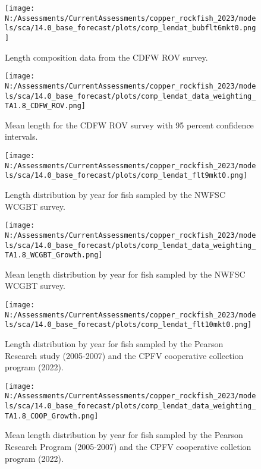 \documentclass[11pt,
  english,
  letterpaper,
]{article}
\begin{document}
\begin{figure}
\centering
\texttt{[image: N:/Assessments/CurrentAssessments/copper\_rockfish\_2023/models/sca/14.0\_base\_forecast/plots/comp\_lendat\_bubflt6mkt0.png]}
\caption{Length composition data from the CDFW ROV survey.\label{fig:rov-len-data}}
\end{figure}

\pagebreak

\begin{figure}
\centering
\texttt{[image: N:/Assessments/CurrentAssessments/copper\_rockfish\_2023/models/sca/14.0\_base\_forecast/plots/comp\_lendat\_data\_weighting\_TA1.8\_CDFW\_ROV.png]}
\caption{Mean length for the CDFW ROV survey with 95 percent confidence intervals.\label{fig:mean-rov-len-data}}
\end{figure}

\pagebreak

\begin{figure}
\centering
\texttt{[image: N:/Assessments/CurrentAssessments/copper\_rockfish\_2023/models/sca/14.0\_base\_forecast/plots/comp\_lendat\_flt9mkt0.png]}
\caption{Length distribution by year for fish sampled by the NWFSC WCGBT survey.\label{fig:growth-wcgbt-len}}
\end{figure}

\pagebreak

\begin{figure}
\centering
\texttt{[image: N:/Assessments/CurrentAssessments/copper\_rockfish\_2023/models/sca/14.0\_base\_forecast/plots/comp\_lendat\_data\_weighting\_TA1.8\_WCGBT\_Growth.png]}
\caption{Mean length distribution by year for fish sampled by the NWFSC WCGBT survey.\label{fig:growth-mean-wcgbt-len}}
\end{figure}

\pagebreak

\begin{figure}
\centering
\texttt{[image: N:/Assessments/CurrentAssessments/copper\_rockfish\_2023/models/sca/14.0\_base\_forecast/plots/comp\_lendat\_flt10mkt0.png]}
\caption{Length distribution by year for fish sampled by the Pearson Research study (2005-2007) and the CPFV cooperative collection program (2022).\label{fig:growth-coop-len}}
\end{figure}

\pagebreak

\begin{figure}
\centering
\texttt{[image: N:/Assessments/CurrentAssessments/copper\_rockfish\_2023/models/sca/14.0\_base\_forecast/plots/comp\_lendat\_data\_weighting\_TA1.8\_COOP\_Growth.png]}
\caption{Mean length distribution by year for fish sampled by the Pearson Research Program (2005-2007) and the CPFV cooperative colletion program (2022).\label{fig:growth-mean-coop-len}}
\end{figure}
\end{document}
